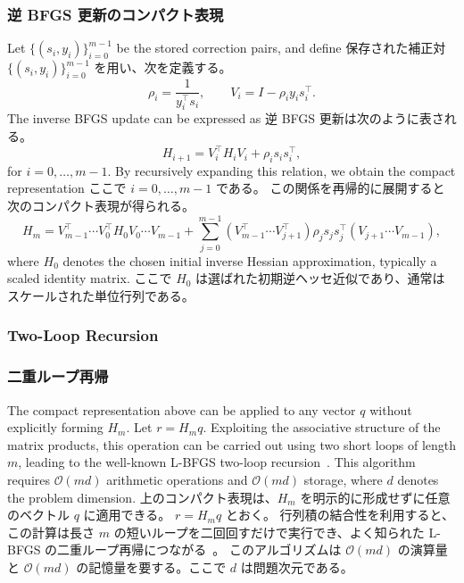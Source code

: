 \documentclass[0_main]{subfiles}
\begin{document}
    \subsubsection{逆 BFGS 更新のコンパクト表現}
\fi

\ifEn
    Let $\{(s_i,y_i)\}_{i=0}^{m-1}$ be the stored correction pairs, and define
\else
    保存された補正対 $\{(s_i,y_i)\}_{i=0}^{m-1}$ を用い、次を定義する。
\fi
\begin{equation*}
    \rho_i = \frac{1}{y_i^\top s_i}, \qquad
    V_i = I - \rho_i y_i s_i^\top.
\end{equation*}
\ifEn
    The inverse BFGS update can be expressed as
\else
    逆 BFGS 更新は次のように表される。
\fi
\begin{equation*}
    H_{i+1} = V_i^\top H_i V_i + \rho_i s_i s_i^\top,
\end{equation*}
\ifEn
    for $i = 0,\dots,m-1$.
    By recursively expanding this relation, we obtain the compact representation
\else
    ここで $i = 0,\dots,m-1$ である。
    この関係を再帰的に展開すると次のコンパクト表現が得られる。
\fi
\begin{equation*}
    H_m
    =
    V_{m-1}^\top \cdots V_0^\top H_0 V_0 \cdots V_{m-1}
    +
    \sum_{j=0}^{m-1}
    (V_{m-1}^\top \cdots V_{j+1}^\top)
    \rho_j s_j s_j^\top
    (V_{j+1} \cdots V_{m-1}),
\end{equation*}
\ifEn
    where $H_0$ denotes the chosen initial inverse Hessian approximation, typically a scaled identity matrix.
\else
    ここで $H_0$ は選ばれた初期逆ヘッセ近似であり、通常はスケールされた単位行列である。
\fi

\ifEn
    \subsubsection{Two-Loop Recursion}
\else
    \subsubsection{二重ループ再帰}
\fi

\ifEn
    The compact representation above can be applied to any vector $q$ without explicitly forming $H_m$.
    Let $r = H_m q$.
    Exploiting the associative structure of the matrix products, this operation can be carried out using two short loops of length $m$, leading to the well-known L-BFGS two-loop recursion~\citep[Algorithm 7.4]{nocedal1999numerical}.
    This algorithm requires $\mathcal{O}(md)$ arithmetic operations and $\mathcal{O}(md)$ storage, where $d$ denotes the problem dimension.
\else
    上のコンパクト表現は、$H_m$ を明示的に形成せずに任意のベクトル $q$ に適用できる。
    $r = H_m q$ とおく。
    行列積の結合性を利用すると、この計算は長さ $m$ の短いループを二回回すだけで実行でき、よく知られた L-BFGS の二重ループ再帰につながる~\citep[Algorithm 7.4]{nocedal1999numerical}。
    このアルゴリズムは $\mathcal{O}(md)$ の演算量と $\mathcal{O}(md)$ の記憶量を要する。ここで $d$ は問題次元である。
\fi
\end{document}
